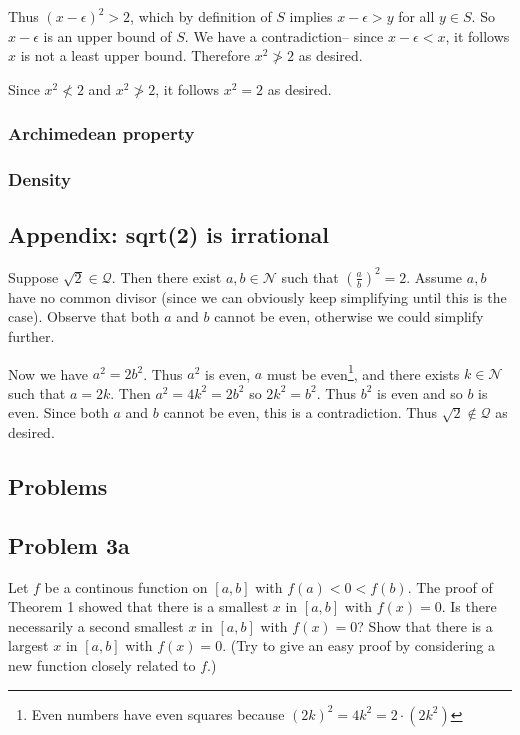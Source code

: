 Thus ${(x-\epsilon)}^{2}>2$, which by definition of $S$ implies
$x-\epsilon>y$ for all $y\in S$. So $x-\epsilon$ is an upper bound of
$S$. We have a contradiction-- since $x-\epsilon<x$, it follows $x$ is not a
least upper bound. Therefore $x^{2}\not>2$ as desired.

\vs

Since $x^{2}\not<2$ and $x^{2}\not>2$, it follows $x^{2}=2$ as
desired.


\subsubsection*{Archimedean property}


\subsubsection*{Density}

\subsection{Appendix: sqrt(2) is irrational}\label{sqrt2proof}
Suppose $\sqrt{2}\in\mathcal{Q}$. Then there exist $a,b\in\mathcal{N}$ such that
$\left(\frac{a}{b}\right)^{2}=2$. Assume $a, b$ have no common divisor
(since we can obviously keep simplifying until this is the case).
Observe that both $a$ and $b$ cannot be even, otherwise we could
simplify further.

\vs

Now we have $a^{2}=2b^{2}$. Thus $a^{2}$ is even, $a$ must be
even\footnote{Even numbers have even squares because
  ${(2k)}^{2}=4k^{2}=2\cdot(2k^{2})$}, and there exists
$k\in\mathcal{N}$ such that $a=2k$. Then $a^{2}=4k^{2}=2b^{2}$ so
$2k^{2}=b^{2}$. Thus $b^{2}$ is even and so $b$ is even. Since both
$a$ and $b$ cannot be even, this is a contradiction. Thus
$\sqrt{2}\notin\mathcal{Q}$ as desired.

\subsection{Problems}
\subsection*{Problem 3a}
Let $f$ be a continous function on $[a, b]$ with $f(a)<0<f(b)$. The
proof of Theorem 1 showed that there is a smallest $x$ in $[a,b]$ with
$f(x)=0$. Is there necessarily a second smallest $x$ in $[a,b]$ with
$f(x)=0$? Show that there is a largest $x$ in $[a,b]$ with $f(x)=0$.
(Try to give an easy proof by considering a new function closely
related to $f$.)

